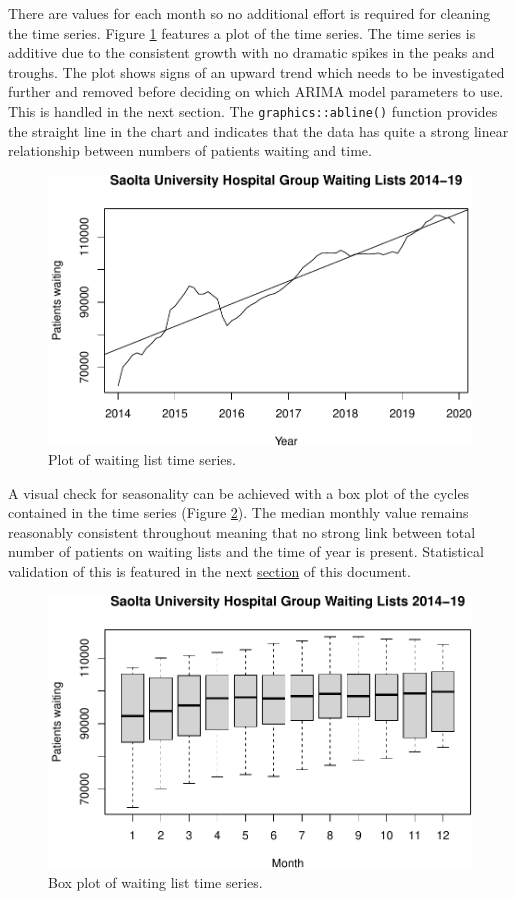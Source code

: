 \documentclass[
  12pt,
]{article}
\begin{document}
There are values for each month so no additional effort is required for cleaning the time series. Figure \ref{fig:ts-plot} features a plot of the time series. The time series is additive due to the consistent growth with no dramatic spikes in the peaks and troughs. The plot shows signs of an upward trend which needs to be investigated further and removed before deciding on which ARIMA model parameters to use. This is handled in the next section. The \texttt{graphics::abline()} function provides the straight line in the chart and indicates that the data has quite a strong linear relationship between numbers of patients waiting and time.

\begin{figure}

{\centering \includegraphics[width=0.8\linewidth]{data_science_ca4_files/figure-latex/ts-plot-1} 

}

\caption{Plot of waiting list time series.}\label{fig:ts-plot}
\end{figure}

A visual check for seasonality can be achieved with a box plot of the cycles contained in the time series (Figure \ref{fig:boxplot}). The median monthly value remains reasonably consistent throughout meaning that no strong link between total number of patients on waiting lists and the time of year is present. Statistical validation of this is featured in the next \hyperref[sec:build-eval]{section} of this document.

\begin{figure}

{\centering \includegraphics[width=0.8\linewidth]{data_science_ca4_files/figure-latex/boxplot-1} 

}

\caption{Box plot of waiting list time series.}\label{fig:boxplot}
\end{figure}
\end{document}
